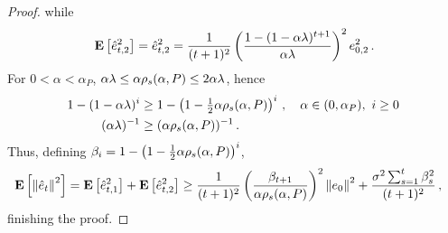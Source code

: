 \begin{proof}
while
\begin{align*}
\mathbf{E}\left[\hat{e}^2_{t,2}\right] = \hat{e}^2_{t,2} = 
\frac{1}{(t+1)^2} \left(\frac{1-(1-\alpha \lambda)^{t+1}}{ \alpha \lambda}\right)^2 e_{0,2}^2\,.
\end{align*}
For $0<\alpha<\alpha_P$, $\alpha\lambda \le \alpha \rho_s(\alpha,P) \le 2\alpha \lambda$, hence 
\begin{align*}
1-(1-\alpha \lambda)^i &\ge 1-\left(1-\tfrac12 \alpha \rho_s(\alpha,P)\right)^i\,, \quad \alpha \in (0,\alpha_P), \,\, i \ge 0\,\\
(\alpha \lambda)^{-1} &\ge  (\alpha \rho_s(\alpha,P))^{-1}\,.
\end{align*}
Thus, defining $\beta_i = 1-\left(1-\tfrac12 \alpha \rho_s(\alpha,P)\right)^i$,
\begin{align*}
\mathbf{E}\left[ \left\| \hat{e}_t\right\|^2 \right] 
& = \mathbf{E}\left[\hat{e}^2_{t,1}\right] + \mathbf{E}\left[\hat{e}^2_{t,2}\right] 
   \ge \frac{1}{(t+1)^2} 
   \left(\frac{\beta_{t+1}}{ \alpha \rho_s(\alpha,P)}\right)^2 \left\| e_0\right\|^2
   +
    \frac{ \sigma^2 \sum_{s=1}^t \beta_{s}^2 }{(t+1)^2}\,,
\end{align*}
finishing the proof.
\end{proof}
